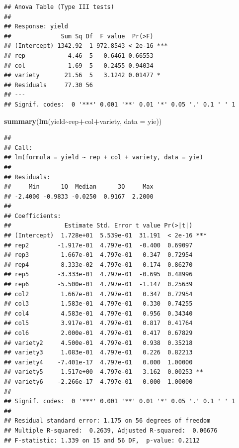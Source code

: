 \documentclass[
]{ctexart}
\newenvironment{Shaded}{\begin{snugshade}}{\end{snugshade}}
\newcommand{\AttributeTok}[1]{\textcolor[rgb]{0.13,0.29,0.53}{#1}}
\newcommand{\FunctionTok}[1]{\textcolor[rgb]{0.13,0.29,0.53}{\textbf{#1}}}
\newcommand{\NormalTok}[1]{#1}
\newcommand{\SpecialCharTok}[1]{\textcolor[rgb]{0.81,0.36,0.00}{\textbf{#1}}}
\begin{document}
\begin{verbatim}
## Anova Table (Type III tests)
## 
## Response: yield
##              Sum Sq Df  F value  Pr(>F)    
## (Intercept) 1342.92  1 972.8543 < 2e-16 ***
## rep            4.46  5   0.6461 0.66553    
## col            1.69  5   0.2455 0.94034    
## variety       21.56  5   3.1242 0.01477 *  
## Residuals     77.30 56                     
## ---
## Signif. codes:  0 '***' 0.001 '**' 0.01 '*' 0.05 '.' 0.1 ' ' 1
\end{verbatim}

\begin{Shaded}
\begin{Highlighting}[]
\FunctionTok{summary}\NormalTok{(}\FunctionTok{lm}\NormalTok{(yield}\SpecialCharTok{\textasciitilde{}}\NormalTok{rep}\SpecialCharTok{+}\NormalTok{col}\SpecialCharTok{+}\NormalTok{variety,}
           \AttributeTok{data =}\NormalTok{ yie))}
\end{Highlighting}
\end{Shaded}

\begin{verbatim}
## 
## Call:
## lm(formula = yield ~ rep + col + variety, data = yie)
## 
## Residuals:
##     Min      1Q  Median      3Q     Max 
## -2.4000 -0.9833 -0.0250  0.9167  2.2000 
## 
## Coefficients:
##               Estimate Std. Error t value Pr(>|t|)    
## (Intercept)  1.728e+01  5.539e-01  31.191  < 2e-16 ***
## rep2        -1.917e-01  4.797e-01  -0.400  0.69097    
## rep3         1.667e-01  4.797e-01   0.347  0.72954    
## rep4         8.333e-02  4.797e-01   0.174  0.86270    
## rep5        -3.333e-01  4.797e-01  -0.695  0.48996    
## rep6        -5.500e-01  4.797e-01  -1.147  0.25639    
## col2         1.667e-01  4.797e-01   0.347  0.72954    
## col3         1.583e-01  4.797e-01   0.330  0.74255    
## col4         4.583e-01  4.797e-01   0.956  0.34340    
## col5         3.917e-01  4.797e-01   0.817  0.41764    
## col6         2.000e-01  4.797e-01   0.417  0.67829    
## variety2     4.500e-01  4.797e-01   0.938  0.35218    
## variety3     1.083e-01  4.797e-01   0.226  0.82213    
## variety4    -7.401e-17  4.797e-01   0.000  1.00000    
## variety5     1.517e+00  4.797e-01   3.162  0.00253 ** 
## variety6    -2.266e-17  4.797e-01   0.000  1.00000    
## ---
## Signif. codes:  0 '***' 0.001 '**' 0.01 '*' 0.05 '.' 0.1 ' ' 1
## 
## Residual standard error: 1.175 on 56 degrees of freedom
## Multiple R-squared:  0.2639, Adjusted R-squared:  0.06676 
## F-statistic: 1.339 on 15 and 56 DF,  p-value: 0.2112
\end{verbatim}
\end{document}
